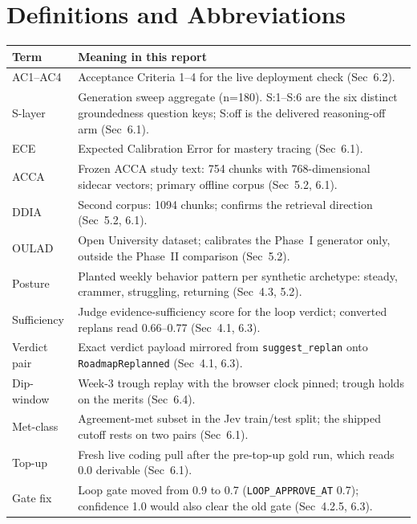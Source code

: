 \documentclass[12pt]{report}
\begin{document}
\chapter*{Definitions and Abbreviations}
{\footnotesize
\begin{tabular}{p{3.2cm} p{11.2cm}}
\toprule
\textbf{Term} & \textbf{Meaning in this report} \\
\midrule
AC1--AC4 & Acceptance Criteria 1--4 for the live deployment check (Sec~6.2). \\
S-layer & Generation sweep aggregate (n=180). S:1--S:6 are the six distinct groundedness question keys; S:off is the delivered reasoning-off arm (Sec~6.1). \\
ECE & Expected Calibration Error for mastery tracing (Sec~6.1). \\
ACCA & Frozen ACCA study text: 754 chunks with 768-dimensional sidecar vectors; primary offline corpus (Sec~5.2, 6.1). \\
DDIA & Second corpus: 1094 chunks; confirms the retrieval direction (Sec~5.2, 6.1). \\
OULAD & Open University dataset; calibrates the Phase~I generator only, outside the Phase~II comparison (Sec~5.2). \\
Posture & Planted weekly behavior pattern per synthetic archetype: steady, crammer, struggling, returning (Sec~4.3, 5.2). \\
Sufficiency & Judge evidence-sufficiency score for the loop verdict; converted replans read 0.66--0.77 (Sec~4.1, 6.3). \\
Verdict pair & Exact verdict payload mirrored from \texttt{suggest\_replan} onto \texttt{RoadmapReplanned} (Sec~4.1, 6.3). \\
Dip-window & Week-3 trough replay with the browser clock pinned; trough holds on the merits (Sec~6.4). \\
Met-class & Agreement-met subset in the Jev train/test split; the shipped cutoff rests on two pairs (Sec~6.1). \\
Top-up & Fresh live coding pull after the pre-top-up gold run, which reads 0.0 derivable (Sec~6.1). \\
Gate fix & Loop gate moved from 0.9 to 0.7 (\texttt{LOOP\_APPROVE\_AT} 0.7); confidence 1.0 would also clear the old gate (Sec~4.2.5, 6.3). \\
\bottomrule
\end{tabular}
}

\newpage
\end{document}
